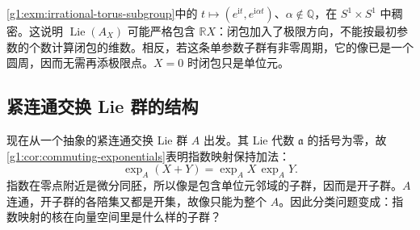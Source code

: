 \cref{g1:exm:irrational-torus-subgroup}中的 \(t\mapsto(e^{\mathrm{i}t},e^{\mathrm{i}\alpha t})\)、\(\alpha\notin\mathbb Q\)，在 \(S^1\times S^1\) 中稠密。这说明 \(\operatorname{Lie}(A_X)\) 可能严格包含 \(\mathbb RX\)：闭包加入了极限方向，不能按最初参数的个数计算闭包的维数。相反，若这条单参数子群有非零周期，它的像已是一个圆周，因而无需再添极限点。\(X=0\) 时闭包只是单位元。

\subsection{紧连通交换 Lie 群的结构}
\label{g1:subsec:1902:02}
现在从一个抽象的紧连通交换 Lie 群 \(A\) 出发。其 Lie 代数 \(\mathfrak a\) 的括号为零，故\cref{g1:cor:commuting-exponentials}表明指数映射保持加法：
\[
	\exp_A(X+Y)=\exp_A X\,\exp_A Y.
\]
指数在零点附近是微分同胚，所以像是包含单位元邻域的子群，因而是开子群。\(A\) 连通，开子群的各陪集又都是开集，故像只能为整个 \(A\)。因此分类问题变成：指数映射的核在向量空间里是什么样的子群？


